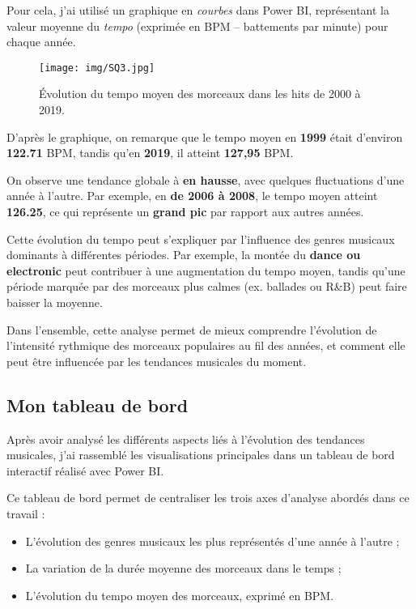 \documentclass[french]{article}
\newcommand{\newLine}{\vspace{0.2cm}}
\begin{document}
Pour cela, j'ai utilisé un graphique en \textit{courbes} dans Power BI, représentant la valeur moyenne du \textit{tempo} (exprimée en BPM – battements par minute) pour chaque année. \newLine

\begin{figure}[h]
	\centering
	\texttt{[image: img/SQ3.jpg]} %
	\caption{Évolution du tempo moyen des morceaux dans les hits de 2000 à 2019.}
	\label{fig:tempo}
\end{figure}

D'après le graphique, on remarque que le tempo moyen en \textbf{1999} était d'environ \textbf{122.71} BPM, tandis qu'en \textbf{2019}, il atteint \textbf{127,95} BPM. \newLine

On observe une tendance globale à \textbf{en hausse}, avec quelques fluctuations d'une année à l'autre. Par exemple, en \textbf{de 2006 à 2008}, le tempo moyen atteint \textbf{126.25}, ce qui représente un \textbf{grand pic} par rapport aux autres années. \newLine

Cette évolution du tempo peut s'expliquer par l'influence des genres musicaux dominants à différentes périodes. Par exemple, la montée du \textbf{dance ou electronic} peut contribuer à une augmentation du tempo moyen, tandis qu'une période marquée par des morceaux plus calmes (ex. ballades ou R\&B) peut faire baisser la moyenne. \newLine

Dans l'ensemble, cette analyse permet de mieux comprendre l'évolution de l'intensité rythmique des morceaux populaires au fil des années, et comment elle peut être influencée par les tendances musicales du moment. \clearpage



\subsection{Mon tableau de bord}

Après avoir analysé les différents aspects liés à l'évolution des tendances musicales, j'ai rassemblé les visualisations principales dans un tableau de bord interactif réalisé avec Power BI.

\newLine

Ce tableau de bord permet de centraliser les trois axes d'analyse abordés dans ce travail :
\begin{itemize}
    \item L'évolution des genres musicaux les plus représentés d'une année à l'autre ;
    \item La variation de la durée moyenne des morceaux dans le temps ;
    \item L'évolution du tempo moyen des morceaux, exprimé en BPM.
\end{itemize}
\end{document}
